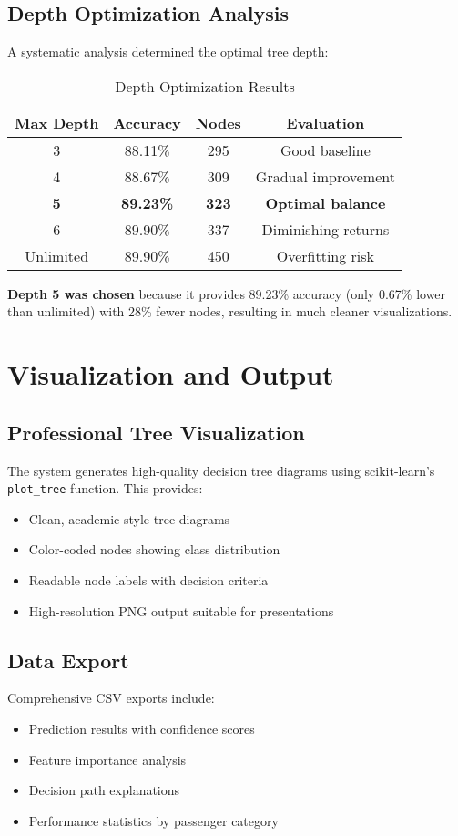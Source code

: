 \documentclass[12pt,a4paper]{article}
\newcommand{\code}[1]{\texttt{#1}}
\begin{document}
\subsection{Depth Optimization Analysis}
A systematic analysis determined the optimal tree depth:

\begin{table}[!htbp]
\centering
\begin{tabular}{|c|c|c|c|}
\hline
\textbf{Max Depth} & \textbf{Accuracy} & \textbf{Nodes} & \textbf{Evaluation} \\
\hline
3 & 88.11\% & 295 & Good baseline \\
4 & 88.67\% & 309 & Gradual improvement \\
\textbf{5} & \textbf{89.23\%} & \textbf{323} & \textbf{Optimal balance} \\
6 & 89.90\% & 337 & Diminishing returns \\
Unlimited & 89.90\% & 450 & Overfitting risk \\
\hline
\end{tabular}
\caption{Depth Optimization Results}
\end{table}

\textbf{Depth 5 was chosen} because it provides 89.23\% accuracy (only 0.67\% lower than unlimited) with 28\% fewer nodes, resulting in much cleaner visualizations.

\section{Visualization and Output}

\subsection{Professional Tree Visualization}
The system generates high-quality decision tree diagrams using scikit-learn's \code{plot\_tree} function. This provides:
\begin{itemize}
    \item Clean, academic-style tree diagrams
    \item Color-coded nodes showing class distribution
    \item Readable node labels with decision criteria
    \item High-resolution PNG output suitable for presentations
\end{itemize}

\subsection{Data Export}
Comprehensive CSV exports include:
\begin{itemize}
    \item Prediction results with confidence scores
    \item Feature importance analysis
    \item Decision path explanations
    \item Performance statistics by passenger category
\end{itemize}
\end{document}
